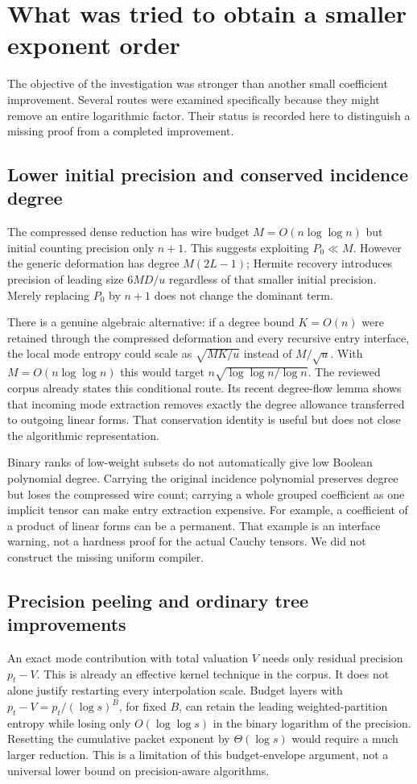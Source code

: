 \section{What was tried to obtain a smaller exponent order}
\label{sec:obstructions}

The objective of the investigation was stronger than another small
coefficient improvement. Several routes were examined specifically because
they might remove an entire logarithmic factor. Their status is recorded
here to distinguish a missing proof from a completed improvement.

\subsection{Lower initial precision and conserved incidence degree}
The compressed dense reduction has wire budget $M=O(n\log\log n)$ but
initial counting precision only $n+1$. This suggests exploiting
$P_0\ll M$. However the generic deformation has degree $M(2L-1)$;
Hermite recovery introduces precision of leading size $6MD/u$ regardless
of that smaller initial precision. Merely replacing $P_0$ by $n+1$
does not change the dominant term.

There is a genuine algebraic alternative: if a degree bound $K=O(n)$
were retained through the compressed deformation and every recursive
entry interface, the local mode entropy could scale as
$\sqrt{MK/u}$ instead of $M/\sqrt u$. With $M=O(n\log\log n)$ this
would target $n\sqrt{\log\log n/\log n}$. The reviewed corpus already
states this conditional route. Its recent degree-flow lemma shows that
incoming mode extraction removes exactly the degree allowance transferred
to outgoing linear forms. That conservation identity is useful but does
not close the algorithmic representation.

Binary ranks of low-weight subsets do not automatically give low Boolean
polynomial degree. Carrying the original incidence polynomial preserves
degree but loses the compressed wire count; carrying a whole grouped
coefficient as one implicit tensor can make entry extraction expensive.
For example, a coefficient of a product of linear forms can be a permanent.
That example is an interface warning, not a hardness proof for the actual
Cauchy tensors. We did not construct the missing uniform compiler.

\subsection{Precision peeling and ordinary tree improvements}
An exact mode contribution with total valuation $V$ needs only residual
precision $p_t-V$. This is already an effective kernel technique in the
corpus. It does not alone justify restarting every interpolation scale.
Budget layers with $p_t-V=p_t/(\log s)^B$, for fixed $B$, can retain
the leading weighted-partition entropy while losing only
$O(\log\log s)$ in the binary logarithm of the precision. Resetting the
cumulative packet exponent by $\Theta(\log s)$ would require a much
larger reduction. This is a limitation of this budget-envelope argument,
not a universal lower bound on precision-aware algorithms.

